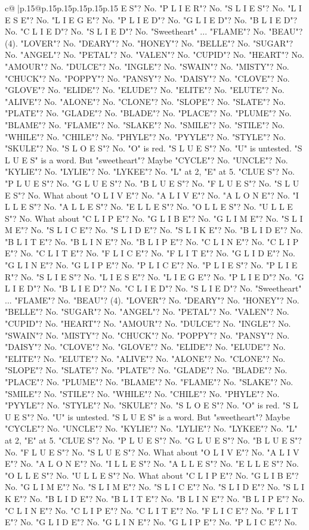 \documentclass{article}
\begin{document}
{\begin{supertabular}{c@{$\;$}|p{.15\linewidth}@{}p{.15\linewidth}p{.15\linewidth}p{.15\linewidth}p{.15\linewidth}p{.15\linewidth}}
{{{E S"? No. "P L I E R"? No. "S L I E S"? No. "L I E S E"? No. "L I E G E"? No. "P L I E D"? No. "G L I E D"? No. "B L I E D"? No. "C L I E D"? No. "S L I E D"? No. "Sweetheart" ... "FLAME"? No. "BEAU"? (4). "LOVER"? No. "DEARY"? No. "HONEY"? No. "BELLE"? No. "SUGAR"? No. "ANGEL"? No. "PETAL"? No. "VALEN"? No. "CUPID"? No. "HEART"? No. "AMOUR"? No. "DULCE"? No. "INGLE"? No. "SWAIN"? No. "MISTY"? No. "CHUCK"? No. "POPPY"? No. "PANSY"? No. "DAISY"? No. "CLOVE"? No. "GLOVE"? No. "ELIDE"? No. "ELUDE"? No. "ELITE"? No. "ELUTE"? No. "ALIVE"? No. "ALONE"? No. "CLONE"? No. "SLOPE"? No. "SLATE"? No. "PLATE"? No. "GLADE"? No. "BLADE"? No. "PLACE"? No. "PLUME"? No. "BLAME"? No. "FLAME"? No. "SLAKE"? No. "SMILE"? No. "STILE"? No. "WHILE"? No. "CHILE"? No. "PHYLE"? No. "PYYLE"? No. "STYLE"? No. "SKULE"? No. "S L O E S"? No. "O" is red. "S L U E S"? No. "U" is untested. "S L U E S" is a word. But "sweetheart"? Maybe "CYCLE"? No. "UNCLE"? No. "KYLIE"? No. "LYLIE"? No. "LYKEE"? No. "L" at 2, "E" at 5. "CLUE S"? No. "P L U E S"? No. "G L U E S"? No. "B L U E S"? No. "F L U E S"? No. "S L U E S"? No. What about "O L I V E"? No. "A L I V E"? No. "A L O N E"? No. "I L L E S"? No. "A L L E S"? No. "E L L E S"? No. "O L L E S"? No. "U L L E S"? No. What about "C L I P E"? No. "G L I B E"? No. "G L I M E"? No. "S L I M E"? No. "S L I C E"? No. "S L I D E"? No. "S L I K E"? No. "B L I D E"? No. "B L I T E"? No. "B L I N E"? No. "B L I P E"? No. "C L I N E"? No. "C L I P E"? No. "C L I T E"? No. "F L I C E"? No. "F L I T E"? No. "G L I D E"? No. "G L I N E"? No. "G L I P E"? No. "P L I C E"? No. "P L I E S"? No. "P L I E R"? No. "S L I E S"? No. "L I E S E"? No. "L I E G E"? No. "P L I E D"? No. "G L I E D"? No. "B L I E D"? No. "C L I E D"? No. "S L I E D"? No. "Sweetheart" ... "FLAME"? No. "BEAU"? (4). "LOVER"? No. "DEARY"? No. "HONEY"? No. "BELLE"? No. "SUGAR"? No. "ANGEL"? No. "PETAL"? No. "VALEN"? No. "CUPID"? No. "HEART"? No. "AMOUR"? No. "DULCE"? No. "INGLE"? No. "SWAIN"? No. "MISTY"? No. "CHUCK"? No. "POPPY"? No. "PANSY"? No. "DAISY"? No. "CLOVE"? No. "GLOVE"? No. "ELIDE"? No. "ELUDE"? No. "ELITE"? No. "ELUTE"? No. "ALIVE"? No. "ALONE"? No. "CLONE"? No. "SLOPE"? No. "SLATE"? No. "PLATE"? No. "GLADE"? No. "BLADE"? No. "PLACE"? No. "PLUME"? No. "BLAME"? No. "FLAME"? No. "SLAKE"? No. "SMILE"? No. "STILE"? No. "WHILE"? No. "CHILE"? No. "PHYLE"? No. "PYYLE"? No. "STYLE"? No. "SKULE"? No. "S L O E S"? No. "O" is red. "S L U E S"? No. "U" is untested. "S L U E S" is a word. But "sweetheart"? Maybe "CYCLE"? No. "UNCLE"? No. "KYLIE"? No. "LYLIE"? No. "LYKEE"? No. "L" at 2, "E" at 5. "CLUE S"? No. "P L U E S"? No. "G L U E S"? No. "B L U E S"? No. "F L U E S"? No. "S L U E S"? No. What about "O L I V E"? No. "A L I V E"? No. "A L O N E"? No. "I L L E S"? No. "A L L E S"? No. "E L L E S"? No. "O L L E S"? No. "U L L E S"? No. What about "C L I P E"? No. "G L I B E"? No. "G L I M E"? No. "S L I M E"? No. "S L I C E"? No. "S L I D E"? No. "S L I K E"? No. "B L I D E"? No. "B L I T E"? No. "B L I N E"? No. "B L I P E"? No. "C L I N E"? No. "C L I P E"? No. "C L I T E"? No. "F L I C E"? No. "F L I T E"? No. "G L I D E"? No. "G L I N E"? No. "G L I P E"? No. "P L I C E"? No. }}}
\end{supertabular}}
\end{document}
